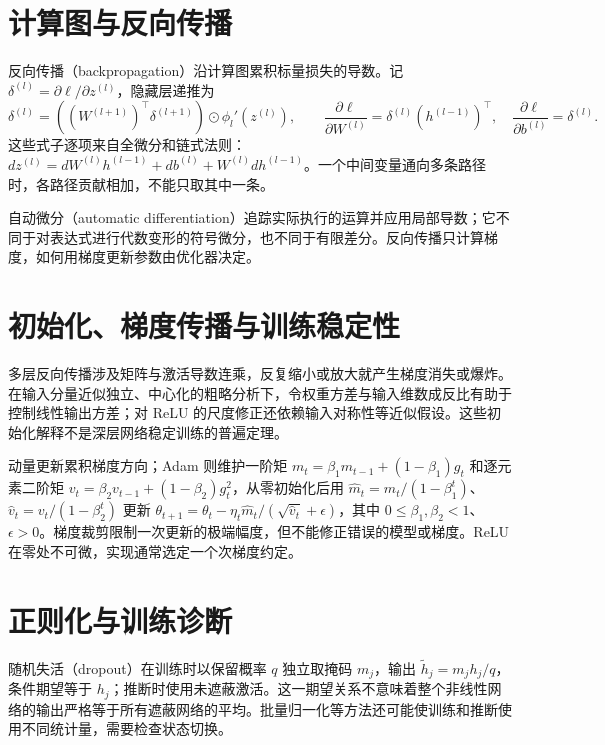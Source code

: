 \documentclass[UTF8,12pt,a4paper,fontset=fandol]{ctexbook}
\begin{document}
\section{计算图与反向传播}

反向传播（backpropagation）沿计算图累积标量损失的导数。记 $\delta^{(l)}=\partial\ell/\partial z^{(l)}$，隐藏层递推为
\begin{equation}
 \delta^{(l)}=((W^{(l+1)})^\top\delta^{(l+1)})\odot\phi_l'(z^{(l)}),\qquad
 \frac{\partial\ell}{\partial W^{(l)}}=\delta^{(l)}(h^{(l-1)})^\top,\quad
 \frac{\partial\ell}{\partial b^{(l)}}=\delta^{(l)}.
 \label{eq:ml-backprop}
\end{equation}
这些式子逐项来自全微分和链式法则：$dz^{(l)}=dW^{(l)}h^{(l-1)}+db^{(l)}+W^{(l)}dh^{(l-1)}$。一个中间变量通向多条路径时，各路径贡献相加，不能只取其中一条。

自动微分（automatic differentiation）追踪实际执行的运算并应用局部导数；它不同于对表达式进行代数变形的符号微分，也不同于有限差分。反向传播只计算梯度，如何用梯度更新参数由优化器决定。

\section{初始化、梯度传播与训练稳定性}

多层反向传播涉及矩阵与激活导数连乘，反复缩小或放大就产生梯度消失或爆炸。在输入分量近似独立、中心化的粗略分析下，令权重方差与输入维数成反比有助于控制线性输出方差；对 ReLU 的尺度修正还依赖输入对称性等近似假设。这些初始化解释不是深层网络稳定训练的普遍定理。

动量更新累积梯度方向；Adam 则维护一阶矩 $m_t=\beta_1m_{t-1}+(1-\beta_1)g_t$ 和逐元素二阶矩 $v_t=\beta_2v_{t-1}+(1-\beta_2)g_t^2$，从零初始化后用
$\widehat m_t=m_t/(1-\beta_1^t)$、$\widehat v_t=v_t/(1-\beta_2^t)$
更新 $\theta_{t+1}=\theta_t-\eta_t\widehat m_t/(\sqrt{\widehat v_t}+\epsilon)$，其中 $0\leq\beta_1,\beta_2<1$、$\epsilon>0$。梯度裁剪限制一次更新的极端幅度，但不能修正错误的模型或梯度。ReLU 在零处不可微，实现通常选定一个次梯度约定。

\section{正则化与训练诊断}

随机失活（dropout）在训练时以保留概率 $q$ 独立取掩码 $m_j$，输出 $\widetilde h_j=m_jh_j/q$，条件期望等于 $h_j$；推断时使用未遮蔽激活。这一期望关系不意味着整个非线性网络的输出严格等于所有遮蔽网络的平均。批量归一化等方法还可能使训练和推断使用不同统计量，需要检查状态切换。
\end{document}
